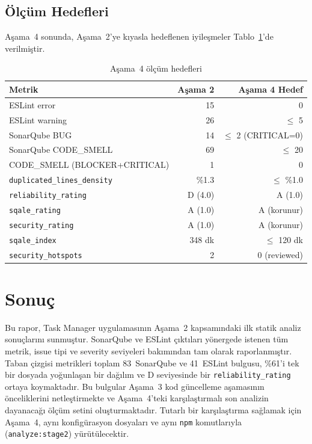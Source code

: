 \documentclass[conference]{IEEEtran}
\begin{document}
\subsection{Ölçüm Hedefleri}

Aşama~4 sonunda, Aşama~2'ye kıyasla hedeflenen iyileşmeler
Tablo~\ref{tab:targets}'de verilmiştir.

\begin{table}[htbp]
\caption{Aşama~4 ölçüm hedefleri}
\label{tab:targets}
\centering
\begin{tabular}{@{}lrr@{}}
\toprule
\textbf{Metrik} & \textbf{Aşama 2} & \textbf{Aşama 4 Hedef} \\
\midrule
ESLint error  & 15 & 0 \\
ESLint warning & 26 & $\leq$ 5 \\
SonarQube BUG & 14 & $\leq$ 2 (CRITICAL=0) \\
SonarQube CODE\_SMELL & 69 & $\leq$ 20 \\
CODE\_SMELL (BLOCKER+CRITICAL) & 1 & 0 \\
\texttt{duplicated\_lines\_density} & \%1.3 & $\leq$ \%1.0 \\
\texttt{reliability\_rating} & D (4.0) & A (1.0) \\
\texttt{sqale\_rating} & A (1.0) & A (korunur) \\
\texttt{security\_rating} & A (1.0) & A (korunur) \\
\texttt{sqale\_index} & 348 dk & $\leq$ 120 dk \\
\texttt{security\_hotspots} & 2 & 0 (reviewed) \\
\bottomrule
\end{tabular}
\end{table}

\section{Sonuç}

Bu rapor, Task Manager uygulamasının Aşama~2 kapsamındaki ilk statik
analiz sonuçlarını sunmuştur. SonarQube ve ESLint çıktıları yönergede
istenen tüm metrik, issue tipi ve severity seviyeleri bakımından tam
olarak raporlanmıştır. Taban çizgisi metrikleri toplam 83~SonarQube ve
41~ESLint bulgusu, \%61'i tek bir dosyada yoğunlaşan bir dağılım ve D
seviyesinde bir \texttt{reliability\_rating} ortaya koymaktadır. Bu
bulgular Aşama~3 kod güncelleme aşamasının önceliklerini netleştirmekte
ve Aşama~4'teki karşılaştırmalı son analizin dayanacağı ölçüm setini
oluşturmaktadır. Tutarlı bir karşılaştırma sağlamak için Aşama~4,
aynı konfigürasyon dosyaları ve aynı \texttt{npm} komutlarıyla
(\texttt{analyze:stage2}) yürütülecektir.
\end{document}
